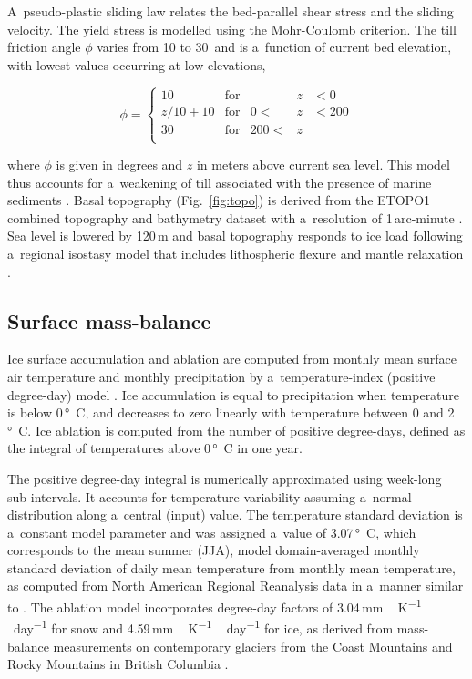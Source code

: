 \documentclass[tc, ms]{copernicus}
\begin{document}
A~pseudo-plastic sliding law \citep{aschwanden-etal-2013} relates the bed-parallel shear stress and the sliding velocity. The yield stress is modelled using the Mohr-Coulomb criterion. The till friction angle $\phi$ varies from 10 to 30\degree\ and is a~function of current bed elevation, with lowest values occurring at low elevations,

\begin{equation}
	\phi = \left\{\begin{array}{llrll}
		10      & \mathrm{for} &      &z&<  0 \\
		z/10+10 & \mathrm{for} &   0 <&z&<200 \\
		30      & \mathrm{for} & 200 <&z&     \\
	\end{array}\right.
\end{equation}

where $\phi$ is given in degrees and $z$ in meters above current sea level. This model thus accounts for a~weakening of till associated with the presence of marine sediments \citep{martin-etal-2011,aschwanden-etal-2013}. Basal topography (Fig.~\ref{fig:topo}) is derived from the ETOPO1 combined topography and bathymetry dataset with a~resolution of 1\,arc-minute \citep{data:etopo1}. Sea level is lowered by 120\,m and basal topography responds to ice load following a~regional isostasy model that includes lithospheric flexure and mantle relaxation \citep{lingle-clark-1985}.

\subsection{Surface mass-balance}

Ice surface accumulation and ablation are computed from monthly mean surface air temperature and monthly precipitation by a~temperature-index (positive degree-day) model \citep{hock-2003}. Ice accumulation is equal to precipitation when temperature is below 0\,\unit{\degree C}, and decreases to zero linearly with temperature between 0 and 2\,\unit{\degree C}. Ice ablation is computed from the number of positive degree-days, defined as the integral of temperatures above 0\,\unit{\degree C} in one year. 

The positive degree-day integral \citep{calov-greve-2005} is numerically approximated using week-long sub-intervals. It accounts for temperature variability assuming a~normal distribution along a~central (input) value. The temperature standard deviation is a~constant model parameter and was assigned a~value of 3.07\,\unit{\degree C}, which corresponds to the mean summer (JJA), model domain-averaged monthly standard deviation of daily mean temperature from monthly mean temperature, as computed from North American Regional Reanalysis data \citep{data:narr} in a~manner similar to \citet{seguinot-2013}. The ablation model incorporates degree-day factors of 3.04\,\unit{mm\,K^{-1}\,day^{-1}} for snow and 4.59\,\unit{mm\,K^{-1}\,day^{-1}} for ice, as derived from mass-balance measurements on contemporary glaciers from the Coast Mountains and Rocky Mountains in British Columbia \citep{shea-etal-2009}.
\end{document}
